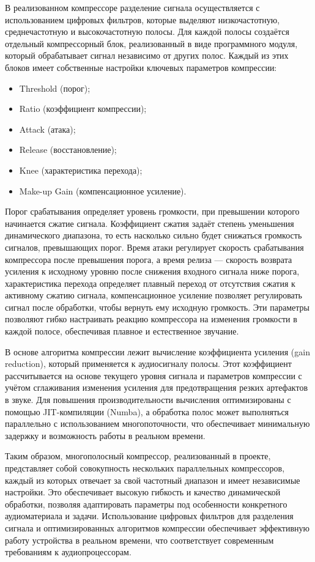 В реализованном компрессоре разделение сигнала осуществляется с использованием цифровых фильтров, которые выделяют низкочастотную, среднечастотную и высокочастотную полосы. Для каждой полосы создаётся отдельный компрессорный блок, реализованный в виде программного модуля, который обрабатывает сигнал независимо от других полос. Каждый из этих блоков имеет собственные настройки ключевых параметров компрессии:
\begin{itemize}
	\item Threshold (порог);
	\item Ratio (коэффициент компрессии); 
	\item Attack (атака);
	\item Release (восстановление);
	\item Knee (характеристика перехода);
	\item Make-up Gain (компенсационное усиление).
\end{itemize}

Порог срабатывания определяет уровень громкости, при превышении которого начинается сжатие сигнала. Коэффициент сжатия задаёт степень уменьшения динамического диапазона, то есть насколько сильно будет снижаться громкость сигналов, превышающих порог. Время атаки регулирует скорость срабатывания компрессора после превышения порога, а время релиза — скорость возврата усиления к исходному уровню после снижения входного сигнала ниже порога, характеристика перехода определяет плавный переход от отсутствия сжатия к активному сжатию сигнала, компенсационное усиление позволяет регулировать сигнал после обработки, чтобы вернуть ему исходную громкость. Эти параметры позволяют гибко настраивать реакцию компрессора на изменения громкости в каждой полосе, обеспечивая плавное и естественное звучание.

В основе алгоритма компрессии лежит вычисление коэффициента усиления (gain reduction), который применяется к аудиосигналу полосы. Этот коэффициент рассчитывается на основе текущего уровня сигнала и параметров компрессии с учётом сглаживания изменения усиления для предотвращения резких артефактов в звуке. Для повышения производительности вычисления оптимизированы с помощью JIT-компиляции (Numba), а обработка полос может выполняться параллельно с использованием многопоточности, что обеспечивает минимальную задержку и возможность работы в реальном времени.

Таким образом, многополосный компрессор, реализованный в проекте, представляет собой совокупность нескольких параллельных компрессоров, каждый из которых отвечает за свой частотный диапазон и имеет независимые настройки. Это обеспечивает высокую гибкость и качество динамической обработки, позволяя адаптировать параметры под особенности конкретного аудиоматериала и задачи. Использование цифровых фильтров для разделения сигнала и оптимизированных алгоритмов компрессии обеспечивает эффективную работу устройства в реальном времени, что соответствует современным требованиям к аудиопроцессорам.

